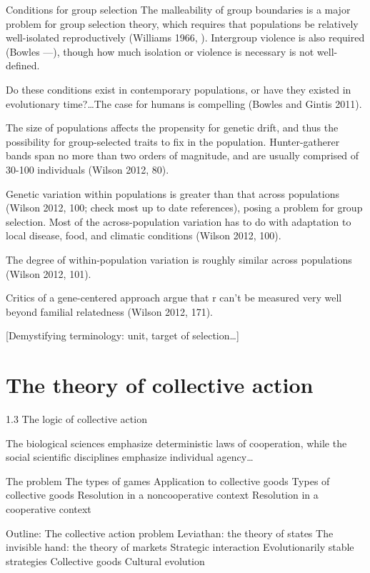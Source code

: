 \documentclass{tufte-book} %
\begin{document}
Conditions for group selection
The malleability of group boundaries is a major problem for group selection theory, which requires that populations be relatively well-isolated reproductively (Williams 1966, ). Intergroup violence is also required (Bowles —), though how much isolation or violence is necessary is not well-defined. 

Do these conditions exist in contemporary populations, or have they existed in evolutionary time?…The case for humans is compelling (Bowles and Gintis 2011). 

The size of populations affects the propensity for genetic drift, and thus the possibility for group-selected traits to fix in the population. Hunter-gatherer bands span no more than two orders of magnitude, and are usually comprised of 30-100 individuals (Wilson 2012, 80). 

Genetic variation within populations is greater than that across populations (Wilson 2012, 100; check most up to date references), posing a problem for group selection. Most of the across-population variation has to do with adaptation to local disease, food, and climatic conditions (Wilson 2012, 100). 

The degree of within-population variation is roughly similar across populations (Wilson 2012, 101). 

Critics of a gene-centered approach argue that r can’t be measured very well beyond familial relatedness (Wilson 2012, 171). 

[Demystifying terminology: unit, target of selection…]

\section{The theory of collective action}\label{collective-action}
1.3 The logic of collective action

The biological sciences emphasize deterministic laws of cooperation, while the social scientific disciplines emphasize individual agency…


The problem
The types of games
Application to collective goods
Types of collective goods
Resolution in a noncooperative context
Resolution in a cooperative context

Outline:
The collective action problem
Leviathan: the theory of states
The invisible hand: the theory of markets
Strategic interaction
Evolutionarily stable strategies
Collective goods
Cultural evolution
\end{document}
